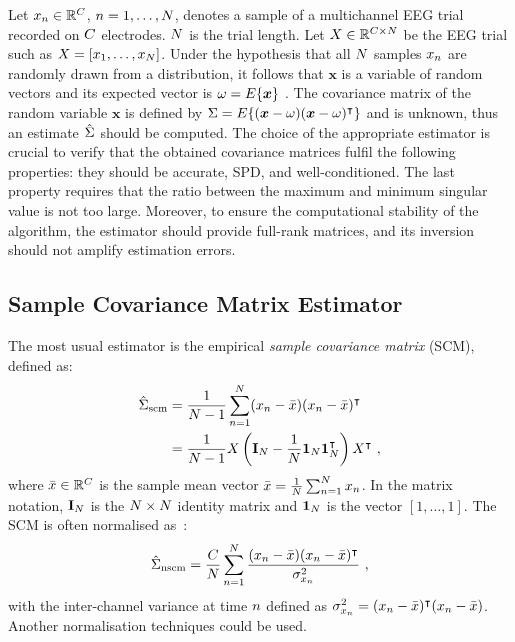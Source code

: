 Let $x_{n} \in \mathbb{R}^{C}$, $n=1, \ldots, N$, denotes a sample of a multichannel EEG trial recorded on $C$ electrodes. 
$N$ is the trial length. 
Let $X \in \mathbb{R}^{C\times N}$ be the EEG trial such as $X = [x_1, \ldots, x_{N} ]$.
Under the hypothesis that all $N$ samples $x_{n}$ are randomly drawn from a distribution, it follows that $\boldsymbol{x}$ is a variable of random vectors and its expected vector is $\omega = E\{ \boldsymbol{x} \}$ \citep{fukunaga_introduction_1990}. %
The covariance matrix of the random variable $\boldsymbol{x}$ is defined by $\Sigma = E\{ (\boldsymbol{x} - \omega)(\boldsymbol{x} - \omega)^{\intercal} \}$ and is unknown, thus an estimate $\hat{\Sigma}_{\operatorname{ }}$ should be computed.
The choice of the appropriate estimator is crucial to verify that the obtained covariance matrices fulfil the following properties: they should be accurate, SPD, and well-conditioned.
The last property requires that the ratio between the maximum and minimum singular value is not too large.
Moreover, to ensure the computational stability of the algorithm, the estimator should provide full-rank matrices, and its inversion should not amplify estimation errors. 

\subsection{Sample Covariance Matrix Estimator}

The most usual estimator is the empirical \emph{sample covariance matrix} (SCM), defined as: 
\begin{equation}
  \begin{split}
    \hat{\Sigma}_{\operatorname{scm}} & = \frac{1}{N-1} \sum_{n=1}^{N} (x_{n} - \bar{x})(x_{n} - \bar{x})^\intercal 
		\\
    & = \frac{1}{N-1} X\left( \mathbf{I}_{N} -\frac{1}{N}\mathbf{1}_{N} \mathbf{1}_{N}^\intercal \right) X^\intercal \ ,
  \end{split}  
\end{equation}
where $\bar{x} \in \mathbb{R}^{C}$ is the sample mean vector $\bar{x} = \frac{1}{N} \sum_{n=1}^{N} x_{n} $.
In the matrix notation, $\mathbf{I}_{N}$ is the $N\times N$ identity matrix and $\mathbf{1}_{N}$ is the vector $[1, \ldots, 1]$.
The SCM is often normalised as~\citep{fukunaga_introduction_1990}:
\begin{equation}
  \label{eq:nscme}
  \cov{nscm} = \frac{\dc}{\dt} \sum_{\si=1}^{\dt} \frac{(\x_\si - \xb)(\x_\si - \xb)^\intercal }{\sigma_{\x_\si}^2} \ ,
\end{equation}
with the inter-channel variance at time $n$ defined as $\sigma_{x_{n}}^2 = (x_{n} - \bar{x})^\intercal (x_{n} - \bar{x})$. %
Another normalisation techniques could be used. 

